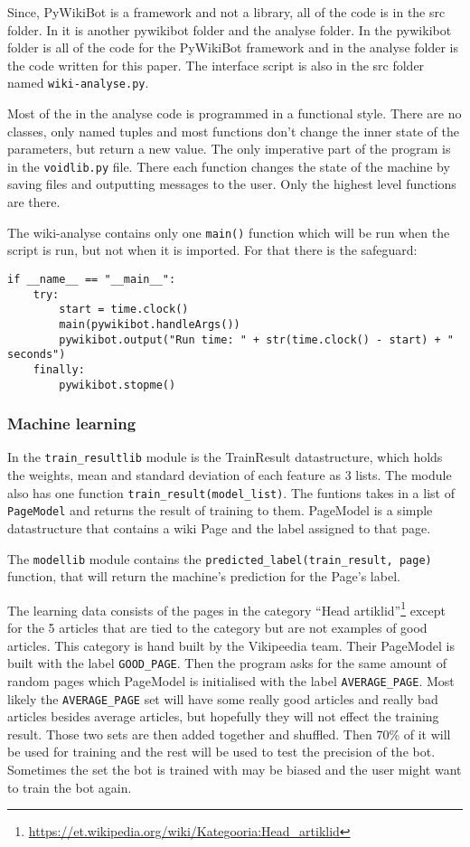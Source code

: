 Since, PyWikiBot is a framework and not a library, all of the code is in the
src folder. In it is another pywikibot folder and the analyse folder.
In the pywikibot folder is all of the code for the PyWikiBot framework and in
the analyse folder is the code written for this paper. The interface script is
also in the src folder named \verb;wiki-analyse.py;.

Most of the in the analyse code is programmed in a functional style. There are
no classes, only named tuples and most functions don't change the inner state of
the parameters, but return a new value. The only imperative part of the program
is in the \verb;voidlib.py; file. There each function changes the state of the
machine by saving files and outputting messages to the user. Only the highest
level functions are there.

The wiki-analyse contains only one \verb;main(); function which will be run
when the script is run, but not when it is imported. For that there is the
safeguard:
\begin{verbatim}
if __name__ == "__main__":
    try:
        start = time.clock()
        main(pywikibot.handleArgs())
        pywikibot.output("Run time: " + str(time.clock() - start) + " seconds")
    finally:
        pywikibot.stopme()
\end{verbatim}

\subsubsection{Machine learning}

In the \verb;train_resultlib; module is the TrainResult datastructure, which
holds the weights, mean and standard deviation of each feature as 3 lists. The
module also has one function \verb;train_result(model_list);. The funtions
takes in a list of \verb;PageModel; and returns the result of training to them.
PageModel is a simple datastructure that contains a wiki Page and the label
assigned to that page.

The \verb;modellib; module contains the
\verb;predicted_label(train_result, page); function, that will return the
machine's prediction for the Page's label.

The learning data consists of the pages in the category ``Head
artiklid''\footnote{\url{https://et.wikipedia.org/wiki/Kategooria:Head_artiklid}}
except for the 5 articles that are tied to the category but are not examples of
good articles. This category is hand built by the Vikipeedia team. Their
PageModel is built with the label \verb;GOOD_PAGE;. Then the program asks for
the same amount of random pages which PageModel is initialised with the label
\verb;AVERAGE_PAGE;. Most likely the \verb;AVERAGE_PAGE; set will have some
really good articles and really bad articles besides average articles, but
hopefully they will not effect the training result. Those two sets are then
added together and shuffled. Then 70\% of it will be used for training and the
rest will be used to test the precision of the bot. Sometimes the set the bot is
trained with may be biased and the user might want to train the bot again.


